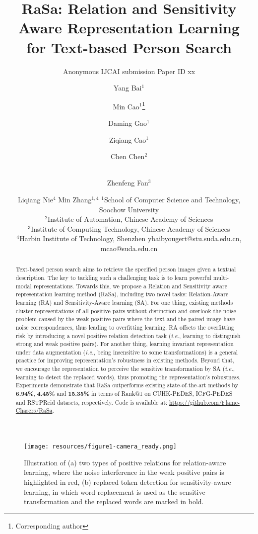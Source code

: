 \documentclass{article}
\title{RaSa: Relation and Sensitivity Aware Representation Learning \\for Text-based Person Search}
\author{
    Anonymous IJCAI submission 
    \affiliations
    Paper ID xx
}
\author{
Yang Bai$^1$\and
Min Cao$^1$\thanks{Corresponding author}\and
Daming Gao$^1$\and
Ziqiang Cao$^1$\and
Chen Chen$^{2}$\and\\
Zhenfeng Fan$^{3}$\and
Liqiang Nie$^4$\And
Min Zhang$^{1,4}$
\affiliations
$^1$School of Computer Science and Technology, Soochow University\\
$^2$Institute of Automation, Chinese Academy of Sciences\\
$^3$Institute of Computing Technology, Chinese Academy of Sciences\\
$^4$Harbin Institute of Technology, Shenzhen
\emails
ybaibyougert@stu.suda.edu.cn,
mcao@suda.edu.cn
}
\begin{document}
\maketitle

\begin{abstract}
Text-based person search aims to retrieve the specified person images given a textual description. 
The key to tackling such a challenging task is to learn powerful multi-modal representations. 
Towards this, we propose a Relation and Sensitivity aware representation learning method (RaSa), including two novel tasks: Relation-Aware learning (RA) and Sensitivity-Aware learning (SA).
For one thing, existing methods cluster representations of all positive pairs without distinction and overlook the noise problem caused by the weak positive pairs where the text and the paired image have noise correspondences, thus leading to overfitting learning.
RA offsets the overfitting risk by introducing a novel positive relation detection task (\emph{i.e.}, learning to distinguish strong and weak positive pairs).
For another thing, learning invariant representation under data augmentation (\emph{i.e.}, being insensitive to some transformations) is a general practice for improving representation's robustness in existing methods. 
Beyond that, we encourage the representation to perceive the sensitive transformation by SA (\emph{i.e.}, learning to detect the replaced words), thus promoting the representation's robustness.
Experiments demonstrate that RaSa outperforms existing state-of-the-art methods by \textbf{6.94\%}, \textbf{4.45\%} and \textbf{15.35\%} in terms of Rank@1 on CUHK-PEDES, ICFG-PEDES and RSTPReid datasets, respectively.
Code is available at: \href{https://github.com/Flame-Chasers/RaSa}{https://github.com/Flame-Chasers/RaSa}.
\end{abstract}



\begin{figure}[ht]
\centering
\vspace{0.5cm}
\texttt{[image: resources/figure1-camera\_ready.png]}
\caption{Illustration of 
        (a) two types of positive relations for relation-aware learning, where the noise interference in the weak positive pairs is highlighted in red,
        (b) replaced token detection for sensitivity-aware learning, in which word replacement is used as the sensitive transformation and the replaced words are marked in bold.}
\label{fig1}
\end{figure}
\end{document}
